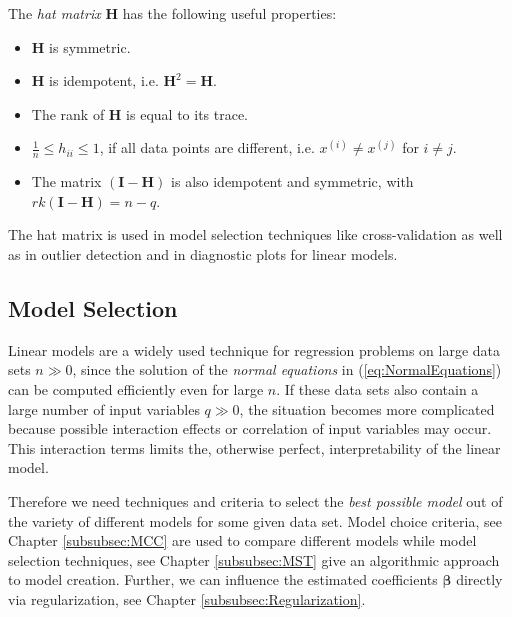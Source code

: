\documentclass[10pt,a4paper]{article}
\begin{document}
The \emph{hat matrix} $\boldsymbol{H}$ has the following useful properties:

\begin{itemize}
	\item $\boldsymbol{H}$ is symmetric.
	\item $\boldsymbol{H}$ is idempotent, i.e. $\boldsymbol{H}^2 = \boldsymbol{H}$.
	\item The rank of $\boldsymbol{H}$ is equal to its trace.
	\item $\frac{1}{n} \le h_{ii} \le 1$, if all data points are different, i.e. $x^{(i)} \ne x^{(j)}$ for $i \ne j$.
	\item The matrix $(\boldsymbol{I} - \boldsymbol{H})$ is also idempotent and symmetric, with $rk(\boldsymbol{I} - \boldsymbol{H}) = n - q$.
\end{itemize}

The hat matrix is used in model selection techniques like cross-validation as well as in outlier detection and in diagnostic plots for linear models.

\subsection{Model Selection}

Linear models are a widely used technique for regression problems on large data sets $n \gg 0$, since the solution of the \emph{normal equations} in (\ref{eq:NormalEquations}) can be computed efficiently even for large $n$. If these data sets also contain a large number of input variables $q \gg 0$, the situation becomes more complicated because possible interaction effects or correlation of input variables may occur. This interaction terms limits the, otherwise perfect, interpretability of the linear model. 

Therefore we need techniques and criteria to select the \emph{best possible model} out of the variety of different models for some given data set. Model choice criteria, see Chapter \ref{subsubsec:MCC} are used to compare different models while model selection techniques, see Chapter \ref{subsubsec:MST} give an algorithmic approach to model creation. Further, we can influence the estimated coefficients $\boldsymbol{\beta}$ directly via regularization, see Chapter \ref{subsubsec:Regularization}. 

\end{document}
